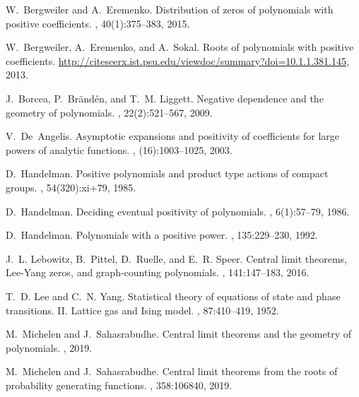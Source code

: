 \documentclass{daj}
\theoremstyle{definition}
\theoremstyle{remark}
\begin{document}
\begin{thebibliography}{10}

W.~Bergweiler and A.~Eremenko.
\newblock Distribution of zeros of polynomials with positive coefficients.
, 40(1):375--383, 2015.

W.~Bergweiler, A.~Eremenko, and A.~Sokal.
\newblock Roots of polynomials with positive coefficients.
\newblock
  \url{http://citeseerx.ist.psu.edu/viewdoc/summary?doi=10.1.1.381.145}, 2013.

J.~Borcea, P.~Br\"{a}nd\'{e}n, and T.~M. Liggett.
\newblock Negative dependence and the geometry of polynomials.
, 22(2):521--567, 2009.

V.~De~Angelis.
\newblock Asymptotic expansions and positivity of coefficients for large powers
  of analytic functions.
, (16):1003--1025, 2003.

D.~Handelman.
\newblock Positive polynomials and product type actions of compact groups.
, 54(320):xi+79, 1985.

D.~Handelman.
\newblock Deciding eventual positivity of polynomials.
, 6(1):57--79, 1986.

D.~Handelman.
\newblock Polynomials with a positive power.
, 135:229--230, 1992.

J.~L. Lebowitz, B.~Pittel, D.~Ruelle, and E.~R. Speer.
\newblock Central limit theorems, {L}ee-{Y}ang zeros, and graph-counting
  polynomials.
, 141:147--183, 2016.

T.~D. Lee and C.~N. Yang.
\newblock Statistical theory of equations of state and phase transitions. {II}.
  {L}attice gas and {I}sing model.
, 87:410--419, 1952.

M.~Michelen and J.~Sahasrabudhe.
\newblock Central limit theorems and the geometry of polynomials.
, 2019.

M.~Michelen and J.~Sahasrabudhe.
\newblock Central limit theorems from the roots of probability generating
  functions.
, 358:106840, 2019.


\end{thebibliography}
\end{document}
